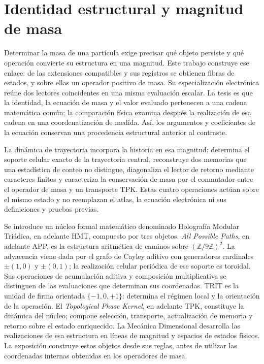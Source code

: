 \section{Identidad estructural y magnitud de masa}
\label{vi:sec:introduccion}

Determinar la masa de una partícula exige precisar qué objeto persiste y
qué operación convierte su estructura en una magnitud. Este trabajo
construye ese enlace: de las extensiones compatibles y sus registros se
obtienen fibras de estados, y sobre ellas un operador positivo de masa.
Su especialización electrónica reúne dos lectores coincidentes en una
misma evaluación escalar. La tesis es que la identidad, la ecuación de
masa y el valor evaluado pertenecen a una cadena matemática común; la
comparación física examina después la realización de esa cadena en una
coordenatización de medida. Así, los argumentos y coeficientes de la ecuación
conservan una procedencia estructural anterior al contraste.

La dinámica de trayectoria incorpora la historia en esa magnitud: determina
el soporte celular exacto de la trayectoria central, reconstruye dos memorias
que una estadística de conteo no distingue, diagonaliza el lector de retorno
mediante caracteres finitos y caracteriza la conservación de masa por el
conmutador entre el operador de masa y un transporte TPK. Estas cuatro
operaciones actúan sobre el mismo estado y no reemplazan el atlas, la ecuación
electrónica ni sus definiciones y pruebas previas.

Se introduce un núcleo formal matemático denominado Holografía Modular
Triádica, en adelante HMT, compuesto por tres objetos. \emph{All Possible
Paths}, en adelante APP, es la estructura aritmética de caminos sobre
\((\mathbb Z/9\mathbb Z)^2\). La adyacencia viene dada por el grafo de
Cayley aditivo con generadores cardinales \(\pm(1,0)\) y \(\pm(0,1)\);
la realización celular periódica de ese soporte es toroidal. Sus
operaciones de acumulación aditiva y composición
multiplicativa se distinguen de las evaluaciones que determinan sus
coordenadas. TRIT es la unidad de firma orientada \(\{-1,0,+1\}\):
determina el régimen local y la orientación de la operación. El
\emph{Topological Phase Kernel}, en adelante TPK, constituye la dinámica
del núcleo; compone selección, transporte, actualización de memoria y
retorno sobre el estado enriquecido. La Mecánica Dimensional desarrolla
las realizaciones de esa estructura en líneas de magnitud y espacios de
estados físicos. La exposición construye estos objetos desde sus reglas,
antes de utilizar las coordenadas internas obtenidas en los operadores de masa.

